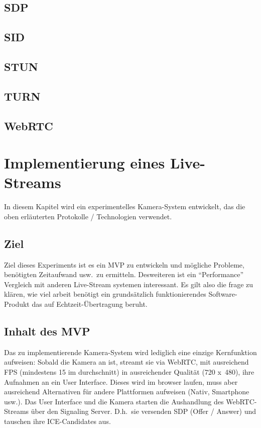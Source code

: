 \documentclass[journal]{IEEEtran}
\begin{document}
\subsection{SDP}
\subsection{SID}
\subsection{STUN}
\subsection{TURN}
\subsection{WebRTC}

\section{Implementierung eines Live-Streams}

In diesem Kapitel wird ein experimentelles Kamera-System entwickelt, das die
oben erläuterten Protokolle / Technologien verwendet.

\subsection{Ziel}
Ziel dieses Experiments ist es ein MVP zu entwickeln und mögliche Probleme,
benötigten Zeitaufwand usw.\ zu ermitteln. Desweiteren ist ein ``Performance''
Vergleich mit anderen Live-Stream systemen interessant. Es gilt also die frage
zu klären, wie viel arbeit benötigt ein grundsätzlich funktionierendes
Software-Produkt das auf Echtzeit-Übertragung beruht.

\subsection{Inhalt des MVP}

Das zu implementierende Kamera-System wird lediglich eine einzige Kernfunktion
aufweisen: Sobald die Kamera an ist, streamt sie via WebRTC, mit ausreichend
FPS (mindestens 15 im durchschnitt) in ausreichender Qualität (720 x\ 480),
ihre Aufnahmen an ein User Interface. Dieses wird im browser laufen, muss aber
ausreichend Alternativen für andere Plattformen aufweisen (Nativ, Smartphone
usw.). Das User Interface und die Kamera starten die Aushandlung des
WebRTC-Streams über den Signaling Server. D.h.\ sie versenden SDP (Offer /
Answer) und tauschen ihre ICE-Candidates aus.
\end{document}
